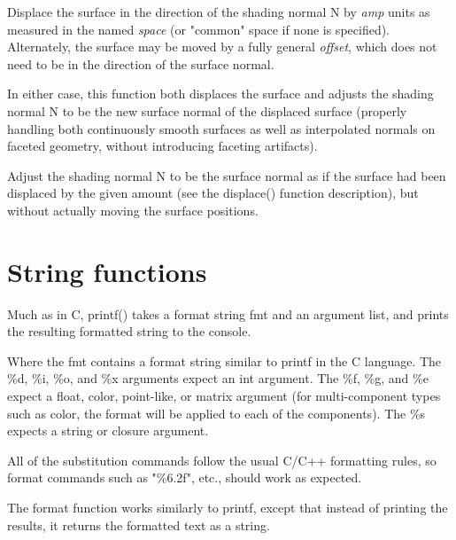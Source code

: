 \documentclass[11pt,letterpaper]{book}
\def\color{{\cf color}\xspace}
\def\float{{\cf float}\xspace}
\def\matrix{{\cf matrix}\xspace}
\def\N{{\cf N}\xspace}
\def\commonspace{{\cf "common"} space\xspace}
\begin{document}
Displace the surface in the direction of the shading normal \N by
\emph{amp} units as measured in the named \emph{space} (or \commonspace
if none is specified).  Alternately, the surface may be moved by a fully
general \emph{offset}, which does not need to be in the direction of the
surface normal.

In either case, this function both displaces the surface and adjusts the
shading normal \N to be the new surface normal of the displaced surface
(properly handling both continuously smooth surfaces as well as
interpolated normals on faceted geometry, without introducing faceting
artifacts).
\apiend


Adjust the shading normal \N to be the surface normal as if the
surface had been displaced by the given amount (see the {\cf displace()}
function description), but without actually moving the surface
positions.
\apiend


\section{String functions}
\label{sec:stdlib:string}


Much as in C, {\cf printf()} takes a format string {\cf fmt} and an
argument list, and prints the resulting formatted string to the console.

Where the {\cf fmt} contains a format string similar to {\cf printf} in
the C language. The {\cf \%d}, {\cf \%i}, {\cf \%o}, and {\cf \%x}
arguments expect an {\cf int} argument.  The {\cf \%f}, {\cf \%g}, and
{\cf \%e} expect a \float, \color, point-like, or \matrix argument (for
multi-component types such as \color, the format will be applied to each
of the components).  The {\cf \%s} expects a {\cf string} or 
{\cf closure} argument.

All of the substitution commands follow the usual C/C++ formatting rules,
so format commands such as {\cf "\%6.2f"}, etc., should work as
expected.
\apiend

The {\cf format} function works similarly to {\cf printf}, except that
instead of printing the results, it returns the formatted text as a
{\cf string}.
\apiend
\end{document}
